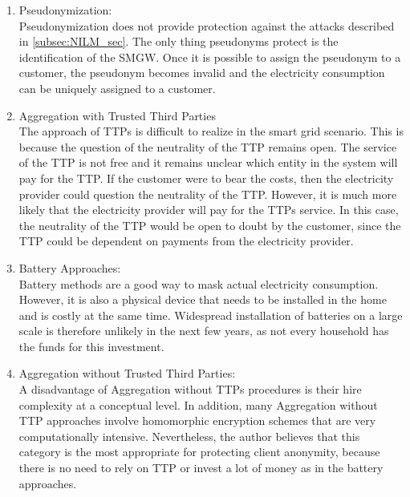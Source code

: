 \begin{enumerate}
\item Pseudonymization:\\
Pseudonymization does not provide protection against the attacks described in \ref{subsec:NILM_sec}. The only thing pseudonyms protect is the identification of the \gls{SMGW}. Once it is possible to assign the pseudonym to a customer, the pseudonym becomes invalid and the electricity consumption can be uniquely assigned to a customer. 

\item Aggregation with Trusted Third Parties\\
The approach of \gls{TTP}s is difficult to realize in the smart grid scenario. This is because the question of the neutrality of the \gls{TTP} remains open. The service of the \gls{TTP} is not free and it remains unclear which entity in the system will pay for the \gls{TTP}. If the customer were to bear the costs, then the electricity provider could question the neutrality of the \gls{TTP}. However, it is much more likely that the electricity provider will pay for the \gls{TTP}s service. In this case, the neutrality of the \gls{TTP} would be open to doubt by the customer, since the \gls{TTP} could be dependent on payments from the electricity provider.

\item Battery Approaches:\\
Battery methods are a good way to mask actual electricity consumption. However, it is also a physical device that needs to be installed in the home and is costly at the same time. Widespread installation of batteries on a large scale is therefore unlikely in the next few years, as not every household has the funds for this investment.

\item Aggregation without Trusted Third Parties:\\
A disadvantage of Aggregation without \gls{TTP}s procedures is their hire complexity at a conceptual level. In addition, many Aggregation without \gls{TTP} approaches involve homomorphic encryption schemes that are very computationally intensive. Nevertheless, the author believes that this category is the most appropriate for protecting client anonymity, because there is no need to rely on \gls{TTP} or invest a lot of money as in the battery approaches.
\end{enumerate}
